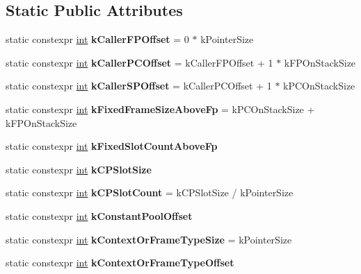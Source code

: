 \subsection*{Static Public Attributes}
\begin{DoxyCompactItemize}
\item 
\mbox{\label{classv8_1_1internal_1_1CommonFrameConstants_aa217c3453e50c5e3c9630130a7caa198}} 
static constexpr \mbox{\hyperlink{classint}{int}} {\bfseries k\+Caller\+F\+P\+Offset} = 0 $\ast$ k\+Pointer\+Size
\item 
\mbox{\label{classv8_1_1internal_1_1CommonFrameConstants_aabd7a61e47b34f2c31109561b5a79fa2}} 
static constexpr \mbox{\hyperlink{classint}{int}} {\bfseries k\+Caller\+P\+C\+Offset} = k\+Caller\+F\+P\+Offset + 1 $\ast$ k\+F\+P\+On\+Stack\+Size
\item 
\mbox{\label{classv8_1_1internal_1_1CommonFrameConstants_a5c3d8dbe62a4eb644105536614625b20}} 
static constexpr \mbox{\hyperlink{classint}{int}} {\bfseries k\+Caller\+S\+P\+Offset} = k\+Caller\+P\+C\+Offset + 1 $\ast$ k\+P\+C\+On\+Stack\+Size
\item 
\mbox{\label{classv8_1_1internal_1_1CommonFrameConstants_af1e15361462e26feb6e4e6520d46af67}} 
static constexpr \mbox{\hyperlink{classint}{int}} {\bfseries k\+Fixed\+Frame\+Size\+Above\+Fp} = k\+P\+C\+On\+Stack\+Size + k\+F\+P\+On\+Stack\+Size
\item 
static constexpr \mbox{\hyperlink{classint}{int}} {\bfseries k\+Fixed\+Slot\+Count\+Above\+Fp}
\item 
static constexpr \mbox{\hyperlink{classint}{int}} {\bfseries k\+C\+P\+Slot\+Size}
\item 
\mbox{\label{classv8_1_1internal_1_1CommonFrameConstants_ad54fb31f460f31a49a5446ba32fe496a}} 
static constexpr \mbox{\hyperlink{classint}{int}} {\bfseries k\+C\+P\+Slot\+Count} = k\+C\+P\+Slot\+Size / k\+Pointer\+Size
\item 
static constexpr \mbox{\hyperlink{classint}{int}} {\bfseries k\+Constant\+Pool\+Offset}
\item 
\mbox{\label{classv8_1_1internal_1_1CommonFrameConstants_a11c9b3f311b76926d96e8e4e7a9bcee0}} 
static constexpr \mbox{\hyperlink{classint}{int}} {\bfseries k\+Context\+Or\+Frame\+Type\+Size} = k\+Pointer\+Size
\item 
static constexpr \mbox{\hyperlink{classint}{int}} {\bfseries k\+Context\+Or\+Frame\+Type\+Offset}
\end{DoxyCompactItemize}



